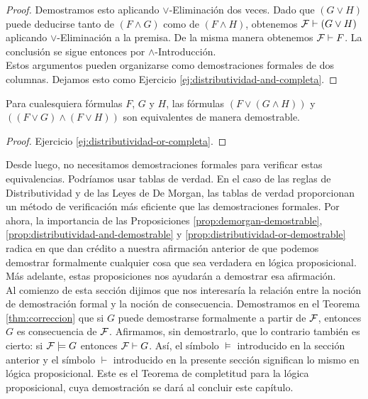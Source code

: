 \message{ !name(main.tex)}\documentclass[12pt,a4paper]{book}
\begin{document}
\begin{proof}
        Demostramos esto aplicando $\vee$-Eliminación dos veces. Dado que $(G\vee H)$ puede deducirse tanto de $(F\wedge G)$
        como de $(F\wedge H)$, obtenemos $\mathcal{F}\vdash(G\vee H)$ aplicando $\vee$-Eliminación a la premisa. De la misma manera
        obtenemos $\mathcal{F}\vdash F$. La conclusión se sigue entonces por $\wedge$-Introducción.\\
        Estos argumentos pueden organizarse como demostraciones formales de dos columnas. Dejamos esto como
        Ejercicio \ref{ej:distributividad-and-completa}.
    \end{proof}

    \begin{proposicion}\label{prop:distributividad-or-demostrable}
        Para cualesquiera fórmulas $F$, $G$ y $H$, las fórmulas $(F\vee(G\wedge H))$ y $((F\vee G)\wedge(F\vee H))$ son
        equivalentes de manera demostrable.
    \end{proposicion}
    \begin{proof}
        Ejercicio \ref{ej:distributividad-or-completa}.
    \end{proof}

    Desde luego, no necesitamos demostraciones formales para verificar estas equivalencias. Podríamos usar tablas de verdad. En
    el caso de las reglas de Distributividad y de las Leyes de De Morgan, las tablas de verdad proporcionan un método de
    verificación más eficiente que las demostraciones formales. Por ahora, la importancia de las Proposiciones
    \ref{prop:demorgan-demostrable}, \ref{prop:distributividad-and-demostrable} y \ref{prop:distributividad-or-demostrable}
    radica en que dan crédito a nuestra afirmación anterior de que podemos demostrar formalmente cualquier cosa que sea
    verdadera en lógica proposicional. Más adelante, estas proposiciones nos ayudarán a demostrar esa afirmación.\\
    Al comienzo de esta sección dijimos que nos interesaría la relación entre la noción de demostración formal y la noción de
    consecuencia. Demostramos en el Teorema \ref{thm:correccion} que si $G$ puede demostrarse formalmente a partir de $\mathcal{F}$,
    entonces $G$ es consecuencia de $\mathcal{F}$. Afirmamos, sin demostrarlo, que lo contrario también es cierto: si
    $\mathcal{F}\models G$ entonces $\mathcal{F}\vdash G$. Así, el símbolo $\models$ introducido en la sección anterior y el símbolo $\vdash$
    introducido en la presente sección significan lo mismo en lógica proposicional. Este es el Teorema de completitud para la
    lógica proposicional, cuya demostración se dará al concluir este capítulo.
\end{document}
